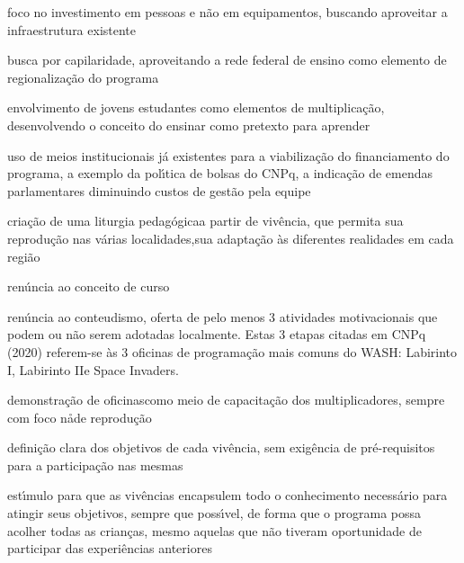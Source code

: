 \documentclass[
12pt,		%
openright,	%
twoside,  %
a4paper,			%
chapter=TITLE,		%
english,			%
french,				%
spanish,			%
brazil				%
]{USPSC-classe/USPSC}
\begin{document}
\begin{alineas}
\item \textquotedbl foco no investimento em pessoas e n\~ao em equipamentos, buscando aproveitar a infraestrutura existente\textquotedbl 
\item \textquotedbl busca por capilaridade, aproveitando a rede federal de ensino como elemento de regionaliza\c{c}\~ao do programa\textquotedbl 
\item \textquotedbl envolvimento de jovens estudantes como elementos de multiplica\c{c}\~ao, desenvolvendo o conceito do ensinar como pretexto para aprender\textquotedbl 
\item \textquotedbl uso de meios institucionais j\'a existentes para a viabiliza\c{c}\~ao do financiamento do programa, a exemplo da pol\'{\i}tica de bolsas do CNPq, a indica\c{c}\~ao de emendas parlamentares diminuindo custos de gest\~ao pela equipe\textquotedbl 
\item \textquotedbl cria\c{c}\~ao de uma  \textquotedbl liturgia pedag\'ogica\textquotedbl  a partir de viv\^encia, que permita sua reprodu\c{c}\~ao nas v\'arias localidades,sua adapta\c{c}\~ao \`as diferentes realidades em cada regi\~ao\textquotedbl 
\item \textquotedbl ren\'uncia ao conceito de curso\textquotedbl 
\item \textquotedbl ren\'uncia ao conteudismo, oferta de pelo menos 3  atividades motivacionais que podem ou n\~ao serem adotadas localmente\textquotedbl . Estas 3 etapas citadas em  CNPq (2020) referem-se \`as 3 oficinas de programa\c{c}\~ao mais comuns do WASH: \textquotedbl Labirinto I\textquotedbl , \textquotedbl Labirinto II\textquotedbl  e \textquotedbl Space Invaders\textquotedbl .
\item \textquotedbl demonstra\c{c}\~ao de oficinas\textquotedbl  como meio de capacita\c{c}\~ao dos multiplicadores, sempre com foco na\r\nsimplicidade de reprodu\c{c}\~ao\textquotedbl 
\item \textquotedbl defini\c{c}\~ao clara dos objetivos de cada viv\^encia, sem exig\^encia de pr\'e-requisitos para a participa\c{c}\~ao nas mesmas\textquotedbl 
\item \textquotedbl est\'{\i}mulo para que as viv\^encias encapsulem todo o conhecimento necess\'ario para  atingir  seus objetivos, sempre que poss\'{\i}vel, de forma que o programa possa acolher todas as crian\c{c}as, mesmo aquelas que n\~ao tiveram oportunidade de participar das experi\^encias anteriores\textquotedbl 
\end{alineas}
\end{document}
